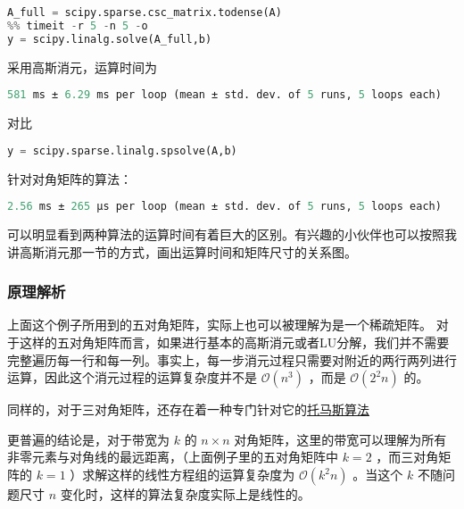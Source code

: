 \begin{lstlisting}[language=python]
A_full = scipy.sparse.csc_matrix.todense(A)
%% timeit -r 5 -n 5 -o
y = scipy.linalg.solve(A_full,b)
\end{lstlisting}

采用高斯消元，运算时间为

\begin{lstlisting}[language=python]
581 ms ± 6.29 ms per loop (mean ± std. dev. of 5 runs, 5 loops each)
\end{lstlisting}

对比

\begin{lstlisting}[language=python]
%%timeit -r 5 -n 5 -o
y = scipy.sparse.linalg.spsolve(A,b)
\end{lstlisting}

针对对角矩阵的算法：

\begin{lstlisting}[language=python]
2.56 ms ± 265 µs per loop (mean ± std. dev. of 5 runs, 5 loops each)
\end{lstlisting}

可以明显看到两种算法的运算时间有着巨大的区别。有兴趣的小伙伴也可以按照我讲高斯消元那一节的方式，画出运算时间和矩阵尺寸的关系图。

\subsubsection{原理解析}

上面这个例子所用到的五对角矩阵，实际上也可以被理解为是一个稀疏矩阵。 对于这样的五对角矩阵而言，如果进行基本的高斯消元或者LU分解，我们并不需要完整遍历每一行和每一列。事实上，每一步消元过程只需要对附近的两行两列进行运算，因此这个消元过程的运算复杂度并不是  $\mathcal{O}(n^3)$  ，而是  $\mathcal{O}(2^2n)$  的。

同样的，对于三对角矩阵，还存在着一种专门针对它的\href{https://en.wikipedia.org/wiki/Tridiagonal_matrix_algorithm}{托马斯算法}

更普遍的结论是，对于带宽为  $k$  的  $n\times n$  对角矩阵，这里的带宽可以理解为所有非零元素与对角线的最远距离，（上面例子里的五对角矩阵中  $k=2$  ，而三对角矩阵的  $k=1$  ）求解这样的线性方程组的运算复杂度为  $\mathcal{O}(k^2n)$  。当这个  $k$  不随问题尺寸  $n $  变化时，这样的算法复杂度实际上是线性的。
